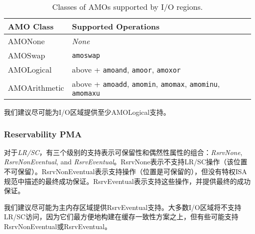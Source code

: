 {\begin{table*}[h!]
\begin{center}
\begin{tabular}{|l|l|}
  \hline
  AMO Class & Supported Operations \\
  \hline
  AMONone       & {\em None} \\
  AMOSwap       & {\tt amoswap} \\
  AMOLogical    & above + {\tt amoand}, {\tt amoor}, {\tt amoxor} \\
  AMOArithmetic & above + {\tt amoadd}, {\tt amomin}, {\tt amomax}, {\tt amominu}, {\tt amomaxu} \\
  \hline
\end{tabular}
\end{center}
\caption{Classes of AMOs supported by I/O regions.}
\label{amoclasses}
\end{table*}

\iffalse
\begin{commentary}
We recommend providing at least AMOLogical support for I/O regions
where possible.
\end{commentary}
\fi
\begin{commentary}
我们建议尽可能为I/O区域提供至少AMOLogical支持。
\end{commentary}

\subsubsection{Reservability PMA}

\iffalse
For {\em LR/SC}, there are three levels of support indicating combinations of
the reservability and eventuality properties:  {\em RsrvNone},
{\em RsrvNonEventual}, and {\em RsrvEventual}.
RsrvNone indicates that no LR/SC operations are supported (the location is
non-reservable).  RsrvNonEventual indicates that the operations are supported
(the location is reservable), but without the eventual success guarantee
described in the unprivileged ISA specification.  RsrvEventual indicates that
the operations are supported and provide the eventual success guarantee.
\fi
对于{\em LR/SC}，有三个级别的支持表示可保留性和偶然性属性的组合：{\em RsrvNone},
{\em RsrvNonEventual}, and {\em RsrvEventual}。RsrvNone表示不支持LR/SC操作（该位置不可保留）。RsrvNonEventual表示支持操作（位置是可保留的），但没有特权ISA规范中描述的最终成功保证。RsrvEventual表示支持这些操作，并提供最终的成功保证。

\iffalse
\begin{commentary}
We recommend providing RsrvEventual support for main memory regions
where possible.  Most I/O regions will not support LR/SC accesses, as
these are most conveniently built on top of a cache-coherence scheme, but some
may support RsrvNonEventual or RsrvEventual.
\end{commentary}
\fi
\begin{commentary}
我们建议尽可能为主内存区域提供RsrvEventual支持。大多数I/O区域将不支持LR/SC访问，因为它们最方便地构建在缓存一致性方案之上，但有些可能支持RsrvNonEventual或RsrvEventual。
\end{commentary}

}
